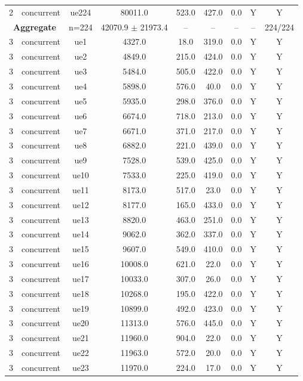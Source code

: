 \begin{table}[ht]
\begin{tabular}{|c|c|c|c|c|c|c|c|c|}
2 & concurrent & ue224 & 80011.0 & 523.0 & 427.0 & 0.0 & Y & Y \\
\multicolumn{2}{|c|}{\textbf{Aggregate}} & n=224 & 42070.9 $\pm$ 21973.4 & -- & -- & -- & -- & 224/224 \\
\hline
3 & concurrent & ue1 & 4327.0 & 18.0 & 319.0 & 0.0 & Y & Y \\
3 & concurrent & ue2 & 4849.0 & 215.0 & 424.0 & 0.0 & Y & Y \\
3 & concurrent & ue3 & 5484.0 & 505.0 & 422.0 & 0.0 & Y & Y \\
3 & concurrent & ue4 & 5898.0 & 576.0 & 40.0 & 0.0 & Y & Y \\
3 & concurrent & ue5 & 5935.0 & 298.0 & 376.0 & 0.0 & Y & Y \\
3 & concurrent & ue6 & 6674.0 & 718.0 & 213.0 & 0.0 & Y & Y \\
3 & concurrent & ue7 & 6671.0 & 371.0 & 217.0 & 0.0 & Y & Y \\
3 & concurrent & ue8 & 6882.0 & 221.0 & 439.0 & 0.0 & Y & Y \\
3 & concurrent & ue9 & 7528.0 & 539.0 & 425.0 & 0.0 & Y & Y \\
3 & concurrent & ue10 & 7533.0 & 225.0 & 419.0 & 0.0 & Y & Y \\
3 & concurrent & ue11 & 8173.0 & 517.0 & 23.0 & 0.0 & Y & Y \\
3 & concurrent & ue12 & 8177.0 & 165.0 & 433.0 & 0.0 & Y & Y \\
3 & concurrent & ue13 & 8820.0 & 463.0 & 251.0 & 0.0 & Y & Y \\
3 & concurrent & ue14 & 9062.0 & 362.0 & 337.0 & 0.0 & Y & Y \\
3 & concurrent & ue15 & 9607.0 & 549.0 & 410.0 & 0.0 & Y & Y \\
3 & concurrent & ue16 & 10008.0 & 621.0 & 22.0 & 0.0 & Y & Y \\
3 & concurrent & ue17 & 10033.0 & 307.0 & 26.0 & 0.0 & Y & Y \\
3 & concurrent & ue18 & 10268.0 & 195.0 & 422.0 & 0.0 & Y & Y \\
3 & concurrent & ue19 & 10899.0 & 492.0 & 423.0 & 0.0 & Y & Y \\
3 & concurrent & ue20 & 11313.0 & 576.0 & 445.0 & 0.0 & Y & Y \\
3 & concurrent & ue21 & 11960.0 & 904.0 & 22.0 & 0.0 & Y & Y \\
3 & concurrent & ue22 & 11963.0 & 572.0 & 20.0 & 0.0 & Y & Y \\
3 & concurrent & ue23 & 11970.0 & 224.0 & 17.0 & 0.0 & Y & Y \\

\end{tabular}
\end{table}
